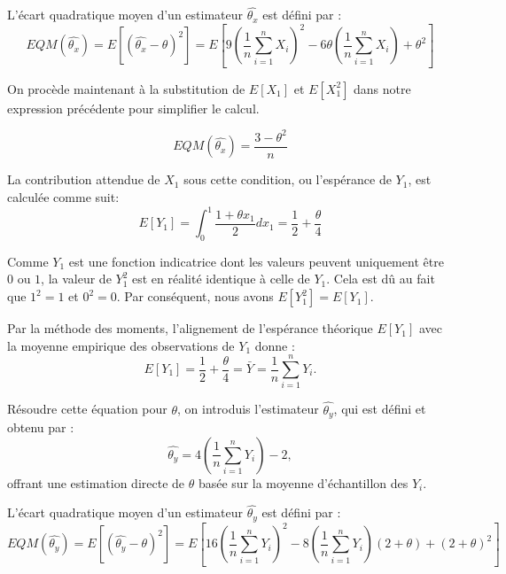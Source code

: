 \documentclass[../main.tex]{subfiles}
\begin{document}
\begin{CJK*}{UTF8}{gbsn}
L'écart quadratique moyen  d'un estimateur $\hat{\theta_x}$ est défini par :
\begin{equation*}
EQM(\hat{\theta_x}) = E[(\hat{\theta_x} - \theta)^2] = E\left[9\left(\frac{1}{n}\sum_{i=1}^{n} X_i\right)^2 - 6\theta\left(\frac{1}{n}\sum_{i=1}^{n} X_i\right) + \theta^2\right]
\end{equation*}

On procède maintenant à la substitution de $E[X_1]$ et $E[X_1^2]$ dans notre expression précédente pour simplifier le calcul.

\begin{equation*}
EQM(\hat{\theta_x}) = \frac{3 - \theta^2}{n}
\end{equation*}


La contribution attendue de $X_1$ sous cette condition, ou l'espérance de $Y_1$, est calculée comme suit:
\begin{equation*}
E[Y_1] = \int_{0}^{1} \frac{1 + \theta x_1}{2} dx_1 = \frac{1}{2} + \frac{\theta}{4}
\end{equation*}

Comme $Y_1$ est une fonction indicatrice dont les valeurs peuvent uniquement être $0$ ou $1$, la valeur de $Y_1^2$ est en réalité identique à celle de $Y_1$. 
Cela est dû au fait que $1^2 = 1$ et $0^2 = 0$. Par conséquent, nous avons $E[Y_1^2] = E[Y_1]$.

Par la méthode des moments, l'alignement de l'espérance théorique $E[Y_1]$ avec la moyenne empirique des observations de $Y_1$ donne :
\begin{equation*}
E[Y_1] = \frac{1}{2} + \frac{\theta}{4} = \bar{Y} = \frac{1}{n}\sum_{i=1}^{n} Y_i.
\end{equation*}

Résoudre cette équation pour $\theta$, on introduis l'estimateur $\hat{\theta_y}$, qui est défini et obtenu par :
\begin{equation*}
\hat{\theta_y} = 4\left(\frac{1}{n}\sum_{i=1}^{n} Y_i\right) - 2,
\end{equation*}
offrant une estimation directe de $\theta$ basée sur la moyenne d'échantillon des $Y_i$.

L'écart quadratique moyen  d'un estimateur $\hat{\theta_y}$ est défini par :
\begin{equation*}
EQM(\hat{\theta_y}) = E[(\hat{\theta_y} - \theta)^2] = E\left[16\left(\frac{1}{n}\sum_{i=1}^{n} Y_i\right)^2 - 8\left(\frac{1}{n}\sum_{i=1}^{n} Y_i\right)(2 + \theta) + (2 + \theta)^2\right]
\end{equation*}


\end{CJK*}
\end{document}
